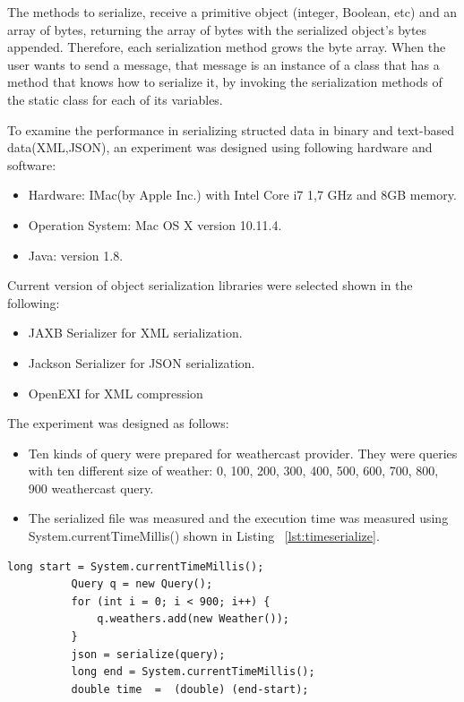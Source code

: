 The methods to serialize, receive a primitive object (integer, Boolean, etc) and an array of bytes, returning the array of bytes with the serialized object’s bytes appended. Therefore, each serialization method grows the byte array. When the user wants to send a message, that message is an instance of a class that has a method that knows how to serialize it, by invoking the serialization methods of the static class for each of its variables.

To examine the performance in serializing structed data in binary and text-based data(XML,JSON), an experiment was designed using following hardware and software:
\begin{itemize}
\item 	Hardware: IMac(by Apple Inc.) with Intel Core i7 1,7 GHz and 8GB memory.
\item 	Operation System: Mac OS X version 10.11.4.
\item 	Java: version 1.8.
\end{itemize}
Current version of object serialization libraries were selected shown in the following:
\begin{itemize}
\item JAXB Serializer for XML serialization.
\item Jackson Serializer for JSON serialization.
\item OpenEXI for XML compression
\end{itemize}
The experiment was designed as follows:
\begin{itemize}
\item Ten kinds of query were prepared for weathercast provider. They were queries with ten different size of weather: 0, 100, 200, 300, 400, 500, 600, 700, 800, 900 weathercast query.
\item The serialized file was measured and the execution time was measured using System.currentTimeMillis() shown in Listing ~\ref{lst:timeserialize}.
\end{itemize}

\begin{lstlisting}[caption=Serialization program for testing, label=lst:timeserialize]
          long start = System.currentTimeMillis();
          Query q = new Query();
          for (int i = 0; i < 900; i++) {
              q.weathers.add(new Weather());
          }
          json = serialize(query);
          long end = System.currentTimeMillis();
          double time  =  (double) (end-start);
\end{lstlisting}

